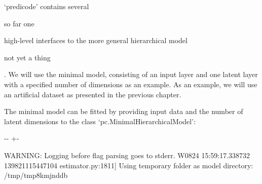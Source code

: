 \documentclass[letterpaper,10pt,english]{sphinxmanual}
\newlength\nbsphinxcodecellspacing
\begin{document}
‘predicode’ contains several %
\begin{footnote}[1]\sphinxAtStartFootnote
so far one
%
\end{footnote} high-level interfaces to the more general hierarchical model %
\begin{footnote}[2]\sphinxAtStartFootnote
not yet a thing
%
\end{footnote}. We will use the minimal model, consisting of an input layer and one latent layer with a specified number of dimensions as an example. As an example, we will use an artificial dataset as presented in the previous chapter.

{
\begin{sphinxVerbatim}[commandchars=\\\{\}]
\llap{\color{nbsphinxin}[3]:\,\hspace{\fboxrule}\hspace{\fboxsep}}    
                               
\end{sphinxVerbatim}
}

The minimal model can be fitted by providing input data and the number of latent dimensions to the class ‘pc.MinimalHierarchicalModel’:

{
\begin{sphinxVerbatim}[commandchars=\\\{\}]
\llap{\color{nbsphinxin}[4]:\,\hspace{\fboxrule}\hspace{\fboxsep}}    
                                    
\end{sphinxVerbatim}
}



%
{
\kern-\sphinxverbatimsmallskipamount\kern-\baselineskip
\kern+\FrameHeightAdjust\kern-\fboxrule
\vspace{\nbsphinxcodecellspacing}
%
\begin{sphinxVerbatim}[commandchars=\\\{\}]
WARNING: Logging before flag parsing goes to stderr.
W0824 15:59:17.338732 139821115447104 estimator.py:1811] Using temporary folder as model directory: /tmp/tmp8kmjnddb
\end{sphinxVerbatim}
}
\relax
\end{document}
